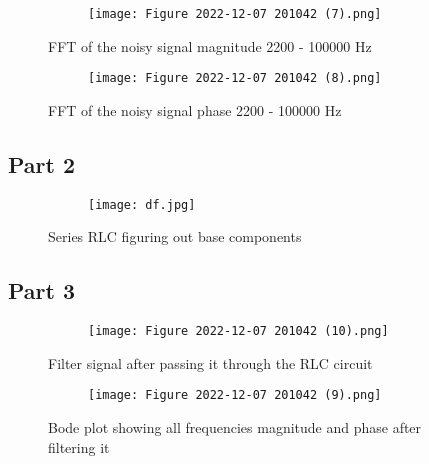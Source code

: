 \documentclass[12pt,a4paper]{article}
\begin{document}
\begin{figure}[h]
\centering
\begin{subfigure}{ 1\textwidth}
\texttt{[image: Figure 2022-12-07 201042 (7).png]}
\end{subfigure}
\caption{ FFT of the noisy signal magnitude 2200 - 100000 Hz  }
\label{fig2:image22}
\end{figure}

\begin{figure}[h]
\centering
\begin{subfigure}{ 1\textwidth}
\texttt{[image: Figure 2022-12-07 201042 (8).png]}
\end{subfigure}
\caption{ FFT of the noisy signal phase 2200 - 100000 Hz  }
\label{fig2:image22}
\end{figure}
\clearpage

\subsection{Part 2}



\begin{figure}[h]
\centering
\begin{subfigure}{ 1\textwidth}
\texttt{[image: df.jpg]}
\end{subfigure}
\caption{ Series RLC figuring out base components}
\label{fig2:image22}
\end{figure}



\clearpage
\subsection{Part 3}

\begin{figure}[h]
\centering
\begin{subfigure}{ 1\textwidth}
\texttt{[image: Figure 2022-12-07 201042 (10).png]}
\end{subfigure}
\caption{ Filter signal after passing it through the RLC circuit  }
\label{fig2:image22}
\end{figure}
\clearpage


\begin{figure}[h]
\centering
\begin{subfigure}{ 1\textwidth}
\texttt{[image: Figure 2022-12-07 201042 (9).png]}
\end{subfigure}
\caption{ Bode plot showing all frequencies magnitude and phase after filtering it}
\label{fig2:image22}
\end{figure}
\end{document}
